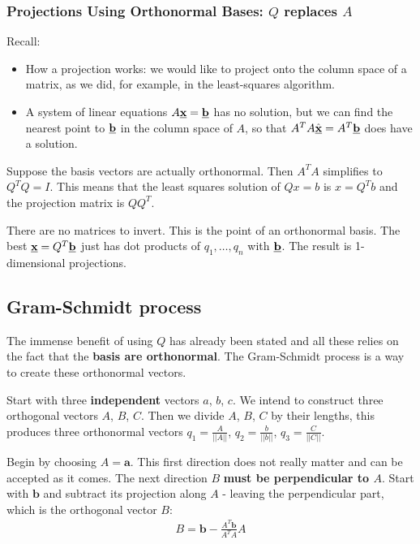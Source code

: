 \documentclass[10pt,a4paper]{article}
\begin{document}
\subsubsection{Projections Using Orthonormal Bases: $Q$ replaces $A$}

Recall:
\begin{itemize}
    \item How a projection works: we would like to project onto the column space of a matrix, as we
    did, for example, in the least-squares algorithm. 
    \item A system of linear equations $A\textbf{\underline{x}} = \textbf{\underline{b}}$ has no
    solution, but we can ﬁnd the nearest point to $\textbf{\underline{b}}$ in the column space of $A$,
    so that $A^T A \hat{\textbf{\underline{x}}} = A^T \textbf{\underline{b}}$ does have a solution.
\end{itemize}

Suppose the basis vectors are actually orthonormal. Then $A^T A$ simplifies to $Q^T Q = I$. This
means that the least squares solution of $Qx = b$ is $x = Q^T b$ and the projection matrix is $QQ^T$. 

There are no matrices to invert. This is the point of an orthonormal basis. The best $\textbf{\underline{x}} = 
Q^T \textbf{\underline{b}}$ just has dot products of $q_1,\dots,q_n$ with $\textbf{\underline{b}}$.
The result is 1-dimensional projections.

\pagebreak

\subsection{Gram-Schmidt process}

The immense benefit of using $Q$ has already been stated and all these relies on the fact that the
\textbf{basis are orthonormal}. The Gram-Schmidt process is a way to create these orthonormal
vectors.

Start with three \textbf{independent} vectors $a$, $b$, $c$. We intend to construct three orthogonal vectors
$A$, $B$, $C$. Then we divide $A$, $B$, $C$ by their lengths, this produces three orthonormal 
vectors $q_1  = \frac{A}{||A||}$,  $q_2  = \frac{b}{||b||}$, $q_3 = \frac{C}{||C||}$.

Begin by choosing $A = \textbf{a}$. This first direction does not really matter and can be accepted as it comes. 
The next direction $B$ \textbf{must be perpendicular to $A$}. Start with $\textbf{b}$ and subtract
its projection along $A$ - leaving the perpendicular part, which is the orthogonal vector $B$:
\begin{align}
    B = \textbf{b} - \frac{A^T \textbf{b}}{A^T A} A
\end{align}
\end{document}
